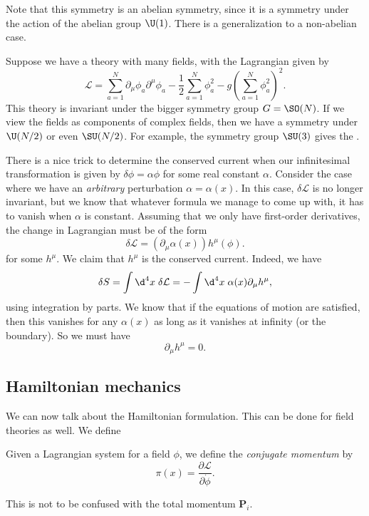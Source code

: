 \documentclass[a4paper]{article}
\begin{document}
Note that this symmetry is an abelian symmetry, since it is a symmetry under the action of the abelian group $\U(1)$. There is a generalization to a non-abelian case.

\begin{eg}
  Suppose we have a theory with many fields, with the Lagrangian given by
  \[
    \mathcal{L} = \sum_{a = 1}^N \partial_\mu \phi_a \partial^\mu \phi_a - \frac{1}{2} \sum_{a = 1}^N \phi_a^2 - g \left(\sum_{a = 1}^N \phi_a^2\right)^2.
  \]
  This theory is invariant under the bigger symmetry group $G = \SO(N)$. If we view the fields as components of complex fields, then we have a symmetry under $\U(N/2)$ or even $\SU(N/2)$. For example, the symmetry group $\SU(3)$ gives the .
\end{eg}

\begin{eg}
  There is a nice trick to determine the conserved current when our infinitesimal transformation is given by $\delta \phi = \alpha \phi$ for some real constant $\alpha$. Consider the case where we have an \emph{arbitrary} perturbation $\alpha = \alpha(x)$. In this case, $\delta\mathcal{L}$ is no longer invariant, but we know that whatever formula we manage to come up with, it has to vanish when $\alpha$ is constant. Assuming that we only have first-order derivatives, the change in Lagrangian must be of the form
  \[
    \delta \mathcal{L} = (\partial_\mu \alpha(x)) h^\mu(\phi).
  \]
  for some $h^\mu$. We claim that $h^\mu$ is the conserved current. Indeed, we have
  \[
    \delta S = \int \d^4 x\; \delta \mathcal{L} = - \int \d^4 x\; \alpha(x) \partial_\mu h^\mu,
  \]
  using integration by parts. We know that if the equations of motion are satisfied, then this vanishes for any $\alpha(x)$ as long as it vanishes at infinity (or the boundary). So we must have
  \[
    \partial_\mu h^\mu = 0.
  \]
\end{eg}

\subsection{Hamiltonian mechanics}
We can now talk about the Hamiltonian formulation. This can be done for field theories as well. We define
\begin{defi}
  Given a Lagrangian system for a field $\phi$, we define the \emph{conjugate momentum} by
  \[
    \pi(x) = \frac{\partial \mathcal{L}}{\partial \dot{\phi}}.
  \]
\end{defi}
This is not to be confused with the total momentum $\mathbf{P}_i$.
\end{document}
